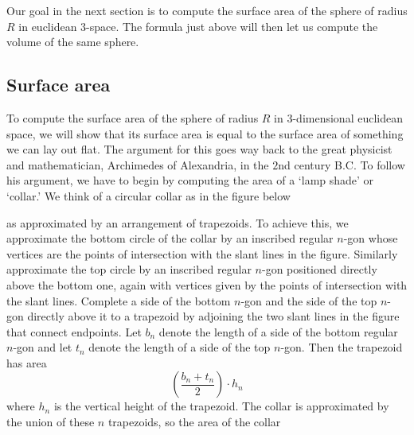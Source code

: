 Our goal in the next section is to compute the surface area of the sphere
of radius $R$ in euclidean $3$-space. The formula just above will then let us
compute the volume of the same sphere.

\subsection*{Surface area}

To compute the surface area of the sphere of radius $R$ in $3$-dimensional
euclidean space, we will show that its surface area is equal to the surface
area of something we can lay out flat. The argument for this goes way back to
the great physicist and mathematician, Archimedes of Alexandria, in the $2$nd
century B.C. To follow his argument, we have to begin by computing the area of
a `lamp shade' or `collar.' We think of a circular collar as in the figure
below%
\begin{image}
\end{image}
as approximated by an arrangement of trapezoids. To achieve this, we
approximate the bottom circle of the collar by an inscribed regular $n$-gon
whose vertices are the points of intersection with the slant lines in the
figure. Similarly approximate the top circle by an inscribed regular $n$-gon
positioned directly above the bottom one, again with vertices given by the
points of intersection with the slant lines. Complete a side of the bottom
$n$-gon and the side of the top $n$-gon directly above it to a trapezoid by
adjoining the two slant lines in the figure that connect endpoints. Let
$b_{n}$ denote the length of a side of the bottom regular $n$-gon and let
$t_{n}$ denote the length of a side of the top $n$-gon. Then the trapezoid has
area%
\[
\left(  \frac{b_{n}+t_{n}}{2}\right)  \cdot h_{n}%
\]
where $h_{n}$ is the vertical height of the trapezoid. The collar is
approximated by the union of these $n$ trapezoids, so the area of the collar
